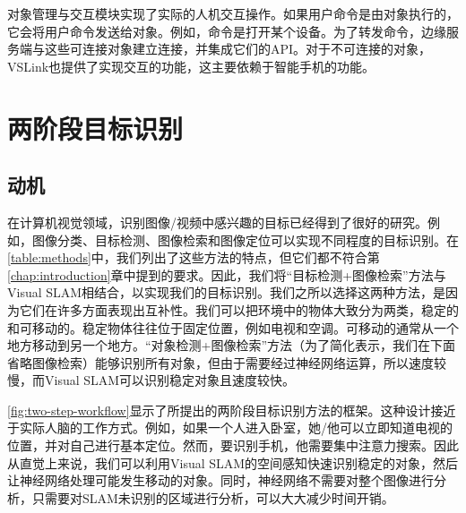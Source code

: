 对象管理与交互模块实现了实际的人机交互操作。如果用户命令是由对象执行的，它会将用户命令发送给对象。例如，命令是打开某个设备。为了转发命令，边缘服务端与这些可连接对象建立连接，并集成它们的API。对于不可连接的对象，VSLink也提供了实现交互的功能，这主要依赖于智能手机的功能。

\chapter{两阶段目标识别}\label{chap:fast}
\section{动机}\label{sec:motivation}
在计算机视觉领域，识别图像/视频中感兴趣的目标已经得到了很好的研究。例如，图像分类\cite{he2019bag}、目标检测\cite{zou2019object}、图像检索\cite{philbin2008lost,zheng2017sift}和图像定位\cite{sattler2011fast}可以实现不同程度的目标识别。在\autoref{table:methods}中，我们列出了这些方法的特点，但它们都不符合第\ref{chap:introduction}章中提到的要求。因此，我们将“目标检测+图像检索”方法与Visual SLAM相结合，以实现我们的目标识别。我们之所以选择这两种方法，是因为它们在许多方面表现出互补性。我们可以把环境中的物体大致分为两类，稳定的和可移动的。稳定物体往往位于固定位置，例如电视和空调。可移动的通常从一个地方移动到另一个地方。“对象检测+图像检索”方法（为了简化表示，我们在下面省略图像检索）能够识别所有对象，但由于需要经过神经网络运算，所以速度较慢，而Visual SLAM可以识别稳定对象且速度较快。

\autoref{fig:two-step-workflow}显示了所提出的两阶段目标识别方法的框架。这种设计接近于实际人脑的工作方式。例如，如果一个人进入卧室，她/他可以立即知道电视的位置，并对自己进行基本定位。然而，要识别手机，他需要集中注意力搜索。因此从直觉上来说，我们可以利用Visual SLAM的空间感知快速识别稳定的对象，然后让神经网络处理可能发生移动的对象。同时，神经网络不需要对整个图像进行分析，只需要对SLAM未识别的区域进行分析，可以大大减少时间开销。


